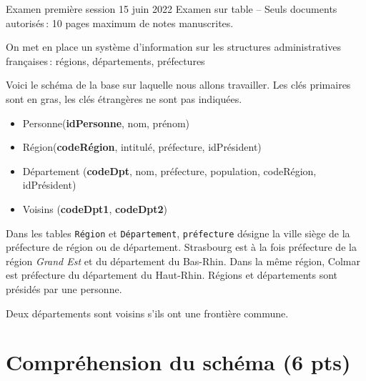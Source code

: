 %
{Examen première session 15 juin 2022}%
{Examen sur table -- Seuls documents autorisés\,: 10 pages maximum de notes manuscrites.}%

On met en place un système d'information sur les structures administratives françaises\,: 
régions, départements, préfectures 

Voici le schéma de la base sur laquelle nous allons travailler. 
Les clés primaires sont en gras, les clés étrangères ne sont pas indiquées.

\begin{itemize}
\item Personne(\textbf{idPersonne}, nom, prénom)
\item Région(\textbf{codeRégion},  intitulé, préfecture, idPrésident)
\item Département (\textbf{codeDpt}, nom, préfecture, population, codeRégion, idPrésident)
\item Voisins (\textbf{codeDpt1}, \textbf{codeDpt2})
\end{itemize}

Dans les tables \texttt{Région} et  \texttt{Département}, \texttt{préfecture} désigne
la ville siège de la préfecture de région ou de département. Strasbourg
est à la fois préfecture de la région \textit{Grand Est} et du  département
du Bas-Rhin. Dans la même région, Colmar est préfecture du département du Haut-Rhin.
Régions et départements sont présidés par une personne.

Deux départements sont voisins s'ils ont une frontière commune.

\section{Compréhension du schéma (6 pts)}


